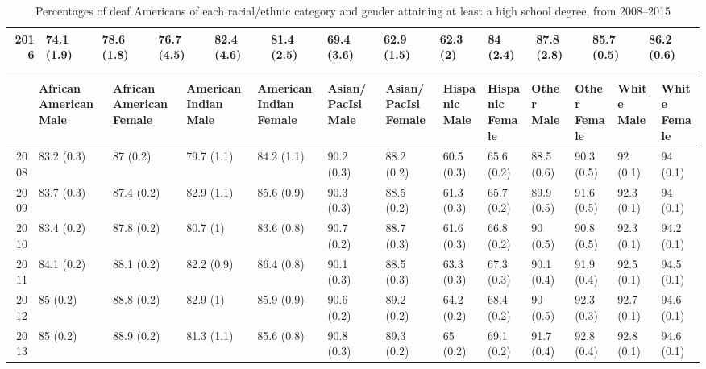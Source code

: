 \documentclass{article}\usepackage[]{graphicx}\usepackage[]{color}
\begin{document}
\begin{landscape}
\begin{table}[ht]
\begin{tabular}{rllllllllllll}
  2016 & 74.1 (1.9) & 78.6 (1.8) & 76.7 (4.5) & 82.4 (4.6) & 81.4 (2.5) & 69.4 (3.6) & 62.9 (1.5) & 62.3 (2) & 84 (2.4) & 87.8 (2.8) & 85.7 (0.5) & 86.2 (0.6) \\
   \hline
\end{tabular}
\caption{Percentages of deaf Americans of each racial/ethnic category and gender attaining at least a high school degree, from 2008--2015}
\end{table}
\begin{table}[ht]
\centering
\begin{tabular}{rllllllllllll}
  \hline
 & \thead{African American\\Male} & \thead{African American\\Female} & \thead{American Indian\\Male} & \thead{American Indian\\Female} & \thead{Asian/PacIsl\\Male} & \thead{Asian/PacIsl\\Female} & \thead{Hispanic\\Male} & \thead{Hispanic\\Female} & \thead{Other\\Male} & \thead{Other\\Female} & \thead{White\\Male} & \thead{White\\Female} \\
  \hline
2008 & 83.2 (0.3) & 87 (0.2) & 79.7 (1.1) & 84.2 (1.1) & 90.2 (0.3) & 88.2 (0.2) & 60.5 (0.3) & 65.6 (0.2) & 88.5 (0.6) & 90.3 (0.5) & 92 (0.1) & 94 (0.1) \\
  2009 & 83.7 (0.3) & 87.4 (0.2) & 82.9 (1.1) & 85.6 (0.9) & 90.3 (0.3) & 88.5 (0.2) & 61.3 (0.3) & 65.7 (0.2) & 89.9 (0.5) & 91.6 (0.5) & 92.3 (0.1) & 94 (0.1) \\
  2010 & 83.4 (0.2) & 87.8 (0.2) & 80.7 (1) & 83.6 (0.8) & 90.7 (0.2) & 88.7 (0.3) & 61.6 (0.3) & 66.8 (0.2) & 90 (0.5) & 90.8 (0.5) & 92.3 (0.1) & 94.2 (0.1) \\
  2011 & 84.1 (0.2) & 88.1 (0.2) & 82.2 (0.9) & 86.4 (0.8) & 90.1 (0.3) & 88.5 (0.3) & 63.3 (0.3) & 67.3 (0.3) & 90.1 (0.4) & 91.9 (0.4) & 92.5 (0.1) & 94.5 (0.1) \\
  2012 & 85 (0.2) & 88.8 (0.2) & 82.9 (1) & 85.9 (0.9) & 90.6 (0.2) & 89.2 (0.2) & 64.2 (0.2) & 68.4 (0.2) & 90 (0.5) & 92.3 (0.3) & 92.7 (0.1) & 94.6 (0.1) \\
  2013 & 85 (0.2) & 88.9 (0.2) & 81.3 (1.1) & 85.6 (0.8) & 90.8 (0.3) & 89.3 (0.2) & 65 (0.2) & 69.1 (0.2) & 91.7 (0.4) & 92.8 (0.4) & 92.8 (0.1) & 94.6 (0.1) \\

\end{tabular}
\end{table}
\end{landscape}
\end{document}
